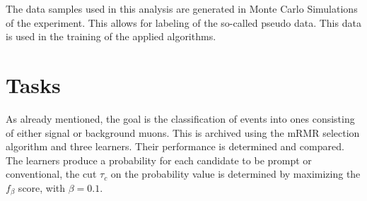 The data samples used in this analysis are generated in Monte Carlo Simulations of the experiment. This allows for labeling of the so-called pseudo data. This data is used in the training of the applied algorithms.

\section{Tasks}
\label{sec:Tasks}

As already mentioned, the goal is the classification of events into ones consisting of either signal or background muons. This is archived using the mRMR selection algorithm and three learners. Their performance is determined and compared. The learners produce a probability for each candidate to be prompt or conventional, the cut $\tau_c$ on the probability value is determined by maximizing the $f_\beta$ score, with $\beta=0.1$. 